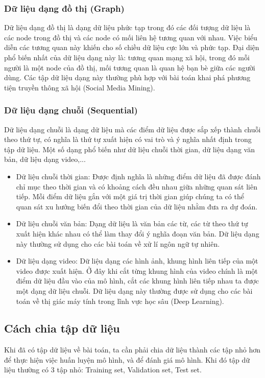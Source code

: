 \subsubsection{Dữ liệu dạng đồ thị (Graph)}
Dữ liệu dạng đồ thị là dạng dữ liệu phức tạp trong đó các đối tượng dữ liệu là các node trong đồ thị và các node có mối liên hệ tương quan với nhau. Việc biểu diễn các tương quan này khiến cho số chiều dữ liệu cực lớn và phức tạp. Đại diện phổ biến nhất của dữ liệu dạng này là: tương quan mạng xã hội, trong đó mỗi người là một node của đồ thị, mối tương quan là quan hệ bạn bè giữa các người dùng. Các tập dữ liệu dạng này thường phù hợp với bài toán khai phá phương tiện truyền thông xã hội (Social Media Mining).
\subsubsection{Dữ liệu dạng chuỗi (Sequential)}
Dữ liệu dạng chuỗi là dạng dữ liệu mà các điểm dữ liệu được sắp xếp thành chuỗi theo thứ tự, có nghĩa là thứ tự xuất hiện có vai trò và ý nghĩa nhất định trong tập dữ liệu. Một số dạng phổ biến như dữ liệu chuỗi thời gian, dữ liệu dạng văn bản, dữ liệu dạng video,...
\begin{itemize}
    \item Dữ liệu chuỗi thời gian: Được định nghĩa là những điểm dữ liệu đã được đánh chỉ mục theo thời gian và có khoảng cách đều nhau giữa những quan sát liên tiếp. Mỗi điểm dữ liệu gắn với một giá trị thời gian giúp chúng ta có thể quan sát xu hướng biến đổi theo thời gian của dữ liệu nhằm đưa ra dự đoán.
    \item Dữ liệu chuỗi văn bản: Dạng dữ liệu là văn bản các từ, các từ theo thứ tự xuất hiện khác nhau có thể làm thay đổi ý nghĩa đoạn văn bản. Dữ liệu dạng này thường sử dụng cho các bài toán về xử lí ngôn ngữ tự nhiên.
    \item Dữ liệu dạng video: Dữ liệu dạng các hình ảnh, khung hình liên tiếp của một video được xuất hiện. Ở đây khi cắt từng khung hình của video chính là một điểm dữ liệu đầu vào của mô hình, cắt các khung hình liên tiếp nhau ta được một dạng dữ liệu chuỗi. Dữ liệu dạng này thường được sử dụng cho các bài toán về thị giác máy tính trong lĩnh vực học sâu (Deep Learning).
\end{itemize}
\subsection{Cách chia tập dữ liệu}
Khi đã có tập dữ liệu về bài toán, ta cần phải chia dữ liệu thành các tập nhỏ hơn để thực hiện việc huấn luyện mô hình, và để đánh giá mô hình. Khi đó tập dữ liệu thường có 3 tập nhỏ: Training set, Validation set, Test set.
